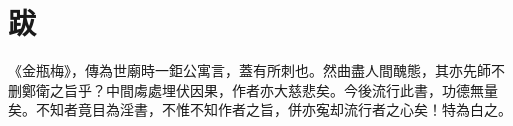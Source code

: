 \chapter*{跋}


《金瓶梅》，傳為世廟時一鉅公寓言，蓋有所刺也。然曲盡人間醜態，其亦先師不删鄭衛之旨乎？中間䖏處埋伏因果，作者亦大慈悲矣。今後流行此書，功德無量矣。不知者竟目為淫書，不惟不知作者之旨，併亦寃却流行者之心矣！特為白之。

\begin{quotation}
\end{quotation}

